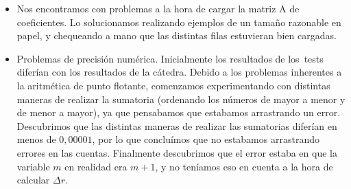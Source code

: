 \begin{itemize}
\item Nos encontramos con problemas a la hora de cargar la matriz A de coeficientes. Lo solucionamos realizando ejemplos de un tamaño razonable en papel, y chequeando a mano que las distintas filas estuvieran bien cargadas.

\item Problemas de precisión numérica. Inicialmente los resultados de los\ tests diferían con los resultados de la cátedra. Debido a los problemas inherentes a la aritmética de punto flotante, comenzamos experimentando con distintas maneras de realizar la sumatoria (ordenando los números de mayor a menor y de menor a mayor), ya que pensabamos que estabamos arrastrando un error. Descubrimos que las distintas maneras de realizar las sumatorias diferían en menos de $0,00001$, por lo que concluímos que no estabamos arrastrando errores en las cuentas. Finalmente descubrimos que el error estaba en que la variable $m$ en realidad era $m+1$, y no teníamos eso en cuenta a la hora de calcular $\Delta r$.

\end{itemize}